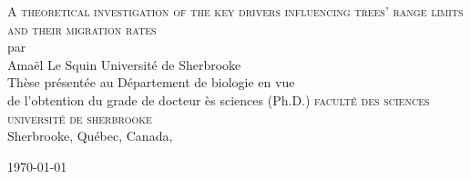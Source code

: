\documentclass[titlepage,oneside,letterpaper,openright,12pt]{report}
\theoremstyle{theo}
\begin{document}
\newpage
\thispagestyle{empty}
\mbox{}

\begin{titlepage}
	\begin{center}
		\textsc{A theoretical investigation of the key drivers influencing trees' range limits and their migration rates} \\
	\vspace{2cm}
	par \\
	\vspace{2cm}
	Amaël Le Squin
	\vspace{1cm}
	Université de Sherbrooke \\
	\vspace{1cm}
	Thèse présentée au Département de biologie en vue \\
	de l'obtention du grade de docteur ès sciences (Ph.D.)
	\vfill
	\textsc{faculté des sciences} \\
	\textsc{université de sherbrooke} \\
	\vspace{2cm}
	Sherbrooke, Québec, Canada, \begin{french} \monthyeardate\today \end{french}
	\end{center}	
\end{titlepage}
\end{document}
